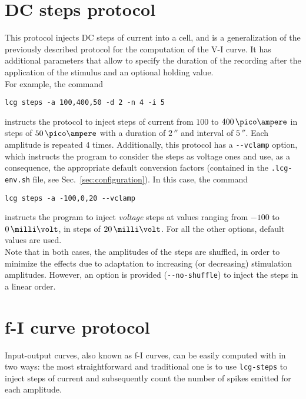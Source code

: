\section{DC steps protocol}
This protocol injects DC steps of current into a cell, and is a
generalization of the previously described protocol for the
computation of the V-I curve. It has additional parameters that allow
to specify the duration of the recording after the application of the
stimulus and an optional holding value.\\
For example, the command
\begin{lstlisting}
lcg steps -a 100,400,50 -d 2 -n 4 -i 5
\end{lstlisting}
instructs the protocol to inject steps of current from $100$ to
$400\,\pico\ampere$ in steps of $50\,\pico\ampere$ with a duration of
$2\,\second$ and interval of $5\,\second$. Each amplitude is repeated
4 times. Additionally, this protocol has a \verb+--vclamp+
option, which instructs the program to consider the steps as voltage ones
and use, as a consequence, the appropriate default conversion factors
(contained in the \verb+.lcg-env.sh+ file, see
Sec.~\ref{sec:configuration}). In this case, the command
\begin{lstlisting}
lcg steps -a -100,0,20 --vclamp
\end{lstlisting}
instructs the program to inject \emph{voltage} steps at values ranging from
$-100$ to $0\,\milli\volt$, in steps of $20\,\milli\volt$. For all the
other options, default values are used.\\
Note that in both cases, the amplitudes of the steps are shuffled, in
order to minimize the effects due to adaptation to increasing (or
decreasing) stimulation amplitudes. However, an option is provided
(\verb+--no-shuffle+) to inject the steps in a linear order.

\section{f-I curve protocol}\label{sec:fi}
Input-output curves, also known as f-I curves, can be easily computed
with \progname in two ways: the most straightforward and traditional
one is to use \verb+lcg-steps+ to inject steps of current and
subsequently count the number of spikes emitted for each amplitude.

